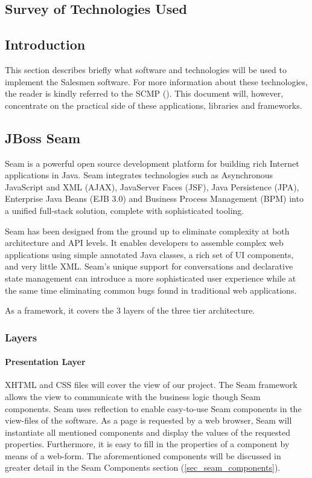\documentclass[salesmen, twoside]{../../../templates/latex/2009/softproj}
\begin{document}
\begin{projdoc}
\section{Survey of Technologies Used}
\subsection{Introduction}
This section describes briefly what software and technologies will be used to implement the Salesmen software. For more information about these technologies, the reader is kindly referred to the SCMP (\cite{SCMP}). This document will, however, concentrate on the practical side of these applications, libraries and frameworks.

\subsection{JBoss Seam}
Seam is a powerful open source development platform for building rich Internet applications in Java. Seam integrates technologies such as Asynchronous JavaScript and XML (AJAX), JavaServer Faces (JSF), Java Persistence (JPA), Enterprise Java Beans (EJB 3.0) and Business Process Management (BPM) into a unified full-stack solution, complete with sophisticated tooling.

Seam has been designed from the ground up to eliminate complexity at both architecture and API levels. It enables developers to assemble complex web applications using simple annotated Java classes, a rich set of UI components, and very little XML. Seam's unique support for conversations and declarative state management can introduce a more sophisticated user experience while at the same time eliminating common bugs found in traditional web applications.

As a framework, it covers the 3 layers of the three tier architecture.

\subsubsection{Layers}
\paragraph{Presentation Layer}
XHTML and CSS files will cover the view of our project. The Seam framework allows the view to communicate with the business logic though Seam components. Seam uses reflection to enable easy-to-use Seam components in the view-files of the software. As a page is requested by a web browser, Seam will instantiate all mentioned components and display the values of the requested properties. Furthermore, it is easy to fill in the properties of a component by means of a web-form. The aforementioned components will be discussed in greater detail in the Seam Components section (\ref{sec_seam_components}).


\end{projdoc}
\end{document}
